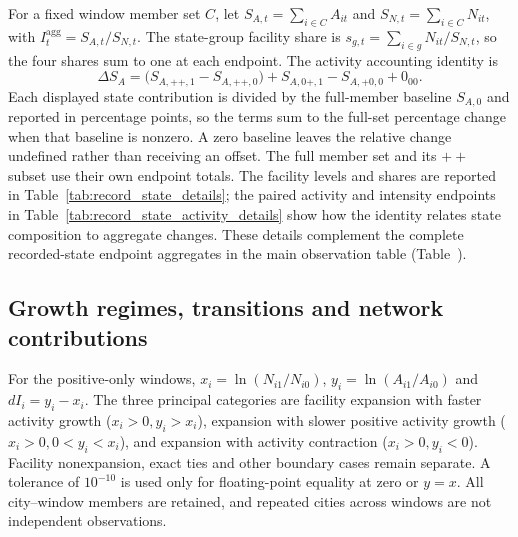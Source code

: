 For a fixed window member set $C$, let
$S_{A,t}=\sum_{i\in C}A_{it}$ and $S_{N,t}=\sum_{i\in C}N_{it}$, with
$I^{\mathrm{agg}}_t=S_{A,t}/S_{N,t}$.  The state-group facility share is
$s_{g,t}=\sum_{i\in g}N_{it}/S_{N,t}$, so the four shares sum to one at each
endpoint.  The activity accounting identity is
\begin{equation}
 \Delta S_A=\bigl(S_{A,++,1}-S_{A,++,0}\bigr)
 +S_{A,0+,1}-S_{A,+0,0}+0_{00}.
 \label{eq:si-state-activity}
\end{equation}
Each displayed state contribution is divided by the full-member baseline
$S_{A,0}$ and reported in percentage points, so the terms sum to the full-set
percentage change when that baseline is nonzero.  A zero baseline leaves the
relative change undefined rather than receiving an offset.  The full member
set and its $++$ subset use their own endpoint totals.  The facility levels and
shares are reported in Table~\ref{tab:record_state_details}; the paired
activity and intensity endpoints in Table~\ref{tab:record_state_activity_details}
show how the identity relates state composition to aggregate changes.  These
details complement the complete recorded-state endpoint aggregates in the
main observation table (Table~).


\subsection{Growth regimes, transitions and network contributions}
For the positive-only windows, $x_i=\ln(N_{i1}/N_{i0})$,
$y_i=\ln(A_{i1}/A_{i0})$ and $dI_i=y_i-x_i$.  The three principal categories
are facility expansion with faster activity growth ($x_i>0,y_i>x_i$),
expansion with slower positive activity growth ($x_i>0,0<y_i<x_i$), and
expansion with activity contraction ($x_i>0,y_i<0$).  Facility nonexpansion,
exact ties and other boundary cases remain separate.  A tolerance of
$10^{-10}$ is used only for floating-point equality at zero or $y=x$.  All
city--window members are retained, and repeated cities across windows are not
independent observations.


